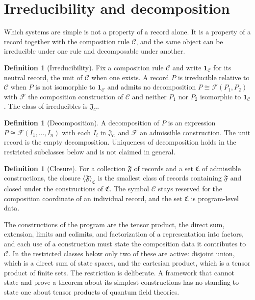 \documentclass[11pt,letterpaper]{article}
\theoremstyle{definition}
\newtheorem{definition}[theorem]{Definition}
\theoremstyle{remark}
\begin{document}
\section{Irreducibility and decomposition}
\label{sec:irreducibility}

Which systems are simple is not a property of a record alone. It is a property of a record together with the composition rule $\mathcal{C}$, and the same object can be irreducible under one rule and decomposable under another.

\begin{definition}[Irreducibility]
\label{def:irreducible}
Fix a composition rule $\mathcal{C}$ and write $\mathbf{1}_{\mathcal{C}}$ for its neutral record, the unit of $\mathcal{C}$ when one exists. A record $P$ is irreducible relative to $\mathcal{C}$ when $P$ is not isomorphic to $\mathbf{1}_{\mathcal{C}}$ and admits no decomposition $P \cong \mathcal{F}(P_1, P_2)$ with $\mathcal{F}$ the composition construction of $\mathcal{C}$ and neither $P_1$ nor $P_2$ isomorphic to $\mathbf{1}_{\mathcal{C}}$. The class of irreducibles is $\mathfrak{J}_{\mathcal{C}}$.
\end{definition}

\begin{definition}[Decomposition]
\label{def:decomposition}
A decomposition of $P$ is an expression $P \cong \mathcal{F}(I_1, \dots, I_n)$ with each $I_i$ in $\mathfrak{J}_{\mathcal{C}}$ and $\mathcal{F}$ an admissible construction. The unit record is the empty decomposition. Uniqueness of decomposition holds in the restricted subclasses below and is not claimed in general.
\end{definition}

\begin{definition}[Closure]
\label{def:closure}
For a collection $\mathfrak{F}$ of records and a set $\mathfrak{C}$ of admissible constructions, the closure $\langle \mathfrak{F} \rangle_{\mathfrak{C}}$ is the smallest class of records containing $\mathfrak{F}$ and closed under the constructions of $\mathfrak{C}$. The symbol $\mathcal{C}$ stays reserved for the composition coordinate of an individual record, and the set $\mathfrak{C}$ is program-level data.
\end{definition}

The constructions of the program are the tensor product, the direct sum, extension, limits and colimits, and factorization of a representation into factors, and each use of a construction must state the composition data it contributes to $\mathcal{C}$. In the restricted classes below only two of these are active: disjoint union, which is a direct sum of state spaces, and the cartesian product, which is a tensor product of finite sets. The restriction is deliberate. A framework that cannot state and prove a theorem about its simplest constructions has no standing to state one about tensor products of quantum field theories.
\end{document}

